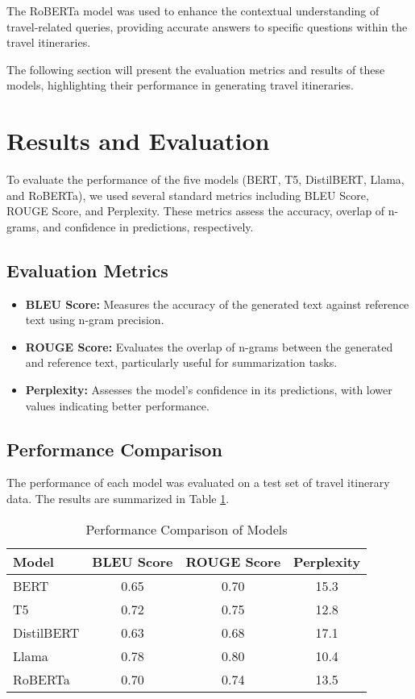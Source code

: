 \documentclass[conference]{IEEEtran}
\begin{document}
The RoBERTa model was used to enhance the contextual understanding of travel-related queries, providing accurate answers to specific questions within the travel itineraries.

The following section will present the evaluation metrics and results of these models, highlighting their performance in generating travel itineraries.





\section{Results and Evaluation}

To evaluate the performance of the five models (BERT, T5, DistilBERT, Llama, and RoBERTa), we used several standard metrics including BLEU Score, ROUGE Score, and Perplexity. These metrics assess the accuracy, overlap of n-grams, and confidence in predictions, respectively.

\subsection{Evaluation Metrics}

\begin{itemize}
    \item \textbf{BLEU Score:} Measures the accuracy of the generated text against reference text using n-gram precision.
    \item \textbf{ROUGE Score:} Evaluates the overlap of n-grams between the generated and reference text, particularly useful for summarization tasks.
    \item \textbf{Perplexity:} Assesses the model's confidence in its predictions, with lower values indicating better performance.
\end{itemize}

\subsection{Performance Comparison}

The performance of each model was evaluated on a test set of travel itinerary data. The results are summarized in Table \ref{tab:results}.

\begin{table}[htbp]
\caption{Performance Comparison of Models}
\centering
\begin{tabular}{|l|c|c|c|}
\hline
\textbf{Model} & \textbf{BLEU Score} & \textbf{ROUGE Score} & \textbf{Perplexity} \\
\hline
BERT & 0.65 & 0.70 & 15.3 \\
T5 & 0.72 & 0.75 & 12.8 \\
DistilBERT & 0.63 & 0.68 & 17.1 \\
Llama & 0.78 & 0.80 & 10.4 \\
RoBERTa & 0.70 & 0.74 & 13.5 \\
\hline
\end{tabular}
\label{tab:results}
\end{table}
\end{document}
